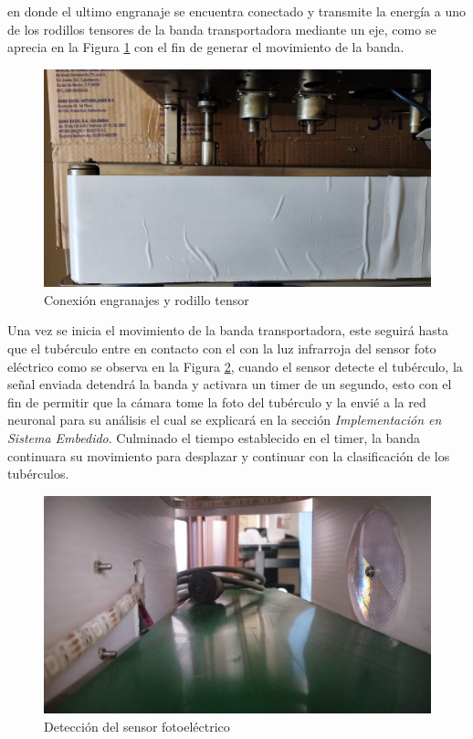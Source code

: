 		  en donde el ultimo engranaje se encuentra conectado y transmite la energía a uno de los rodillos tensores de la banda transportadora mediante un eje, como se aprecia en la Figura \ref{fig:eje} con el fin de generar el movimiento de la banda. 

		\begin{figure}[ht]
			\centering
			\includegraphics[angle=270, scale=0.21]{Figs/202.jpg}
			\caption{Conexión engranajes y rodillo tensor}
			\label{fig:eje}
		\end{figure}

	
		Una vez se inicia el movimiento de la banda transportadora, este seguirá hasta que el tubérculo entre en contacto con el con la luz infrarroja del sensor foto eléctrico como se observa en la Figura \ref{fig:sensor}, cuando el sensor detecte el tubérculo, la señal enviada detendrá la banda y activara un timer de un segundo, esto con el fin de permitir que la cámara tome la foto del tubérculo y la envié a la red neuronal para su análisis el cual se explicará en la sección \textit{Implementación en Sistema Embedido}. Culminado el tiempo establecido en el timer, la banda continuara su movimiento para desplazar y continuar con la clasificación de los tubérculos.
		
		\newpage
		\begin{figure}[ht]
			\centering
			\includegraphics[scale=0.15]{Figs/203.jpg}
			\caption{Detección del sensor fotoeléctrico}
			\label{fig:sensor}
		\end{figure}
	
